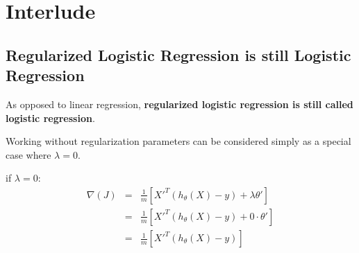 
\section*{Interlude}
\subsection*{Regularized Logistic Regression is still Logistic Regression}
As opposed to linear regression, \textbf{regularized logistic regression is still called logistic regression}.  

Working without regularization parameters can be considered simply as a special case where $\lambda = 0$.


if $\lambda = 0$:
\begin{eqnarray*}
    \nabla(J)   & = & \frac{1}{m} [X'^T(h_\theta(X) - y) + \lambda \theta'] \\
                & = & \frac{1}{m} [X'^T(h_\theta(X) - y) + 0 \cdot \theta'] \\
                & = & \frac{1}{m} [X'^T(h_\theta(X) - y)]    
\end{eqnarray*}